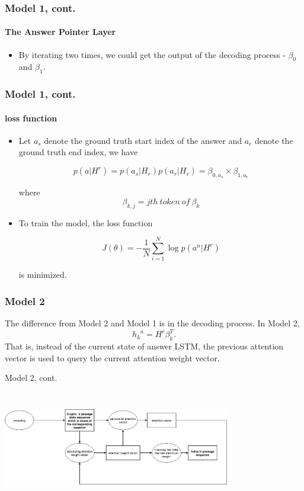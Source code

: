\documentclass{beamer}
\begin{document}
\begin{frame}\frametitle{Model 1, cont.}\framesubtitle{The Answer Pointer Layer}
    \begin{itemize}
        \item By iterating two times, we could get the output of the decoding process - $\beta _0$ and $\beta _1$.
    \end{itemize}

\end{frame}

\begin{frame}\frametitle{Model 1, cont.}\framesubtitle{loss function}
    \begin{itemize}
        \item Let $a_s$ denote the ground truth start index of the answer and $a_e$ denote the ground truth end index, we have

        $$p(a|H^r) = p(a_s|H_r)p(a_r|H_r)=\beta _{0, a_s} \times \beta_{1, a_e}$$

        where $$\beta_{k, j} = jth\ token\ of\ \beta _k$$
        \item To train the model, the loss function

        $$J(\theta) = -\frac{1}{N}\sum_{i=1}^{N} \log{p(a^n|H^r)} $$

        is minimized.

    \end{itemize}

\end{frame}

\begin{frame} \frametitle{Model 2}
    The difference from Model 2 and Model 1 is in the decoding process. In Model 2,
    $${h_k}^a = H^r\beta _{k}^T.$$
    That is, instead of the current state of answer LSTM, the previous attention vector is used to query the current attention weight vector.
\end{frame}


\begin{frame}{Model 2, cont.}
    \begin{center}
        \includegraphics[width=10cm, height=5cm]{figures/model2_decoder.png}
    \end{center}
\end{frame}
\end{document}
